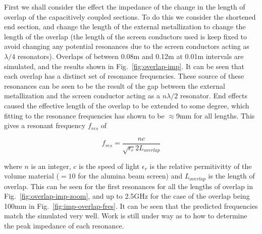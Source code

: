 First we shall consider the effect the impedance of the change in the length of overlap of the capacitively coupled sections. To do this we consider the shortened end section, and change the length of the external metallization to change the length of the overlap (the length of the screen conductors used is keep fixed to avoid changing any potential resonances due to the screen conductors acting as $\lambda /4$ resonators). Overlaps of between 0.08m and 0.12m at 0.01m intervals are simulated, and the results shown in Fig.~\ref{fig:overlap-imp}. It can be seen that each overlap has a distinct set of resonance frequencies. These source of these resonances can be seen to be the result of the gap between the external metallization and the screen conductor acting as a $n \lambda /2$ resonator. End effects caused the effective length of the overlap to be extended to some degree, which fitting to the resonance frequencies has shown to be $\approx 9$mm for all lengths. This gives a resonant frequency $f_{res}$ of

\begin{equation}
f_{res} = \frac{nc}{\sqrt{\epsilon_{r}}2 L_{overlap}}
\label{fig:imp-overlap-fres}
\end{equation}

where $n$ is an integer, $c$ is the speed of light $\epsilon_{r}$ is the relative permitivitty of the volume material ($=10$ for the alumina beam screen) and $L_{overlap}$ is the length of overlap. This can be seen for the first resonances for all the lengths of overlap in Fig.~\ref{fig:overlap-imp-zoom}, and up to 2.5GHz for the case of the overlap being 100mm in Fig.~\ref{fig:imp-overlap-fres}. It can be seen that the predicted frequencies match the simulated very well. Work is still under way as to how to determine the peak impedance of each resonance.

